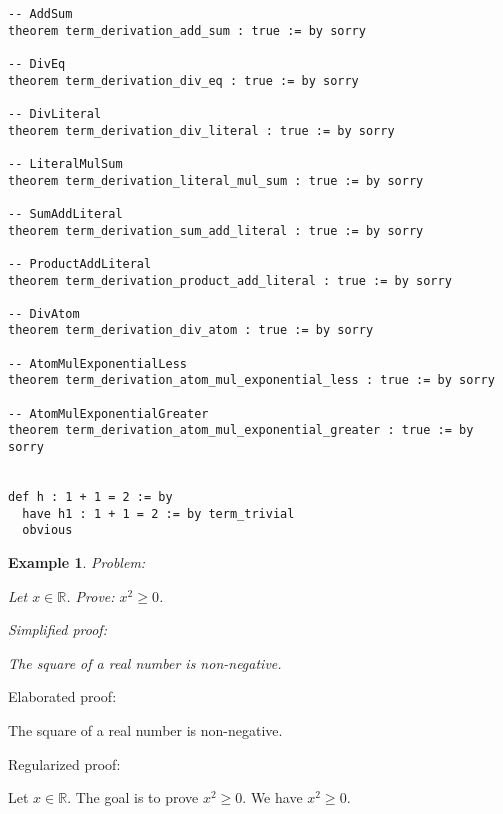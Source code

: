 \documentclass{article}
\newtheorem{example}{Example}
\begin{document}
\begin{tcolorbox}[colback=white!10, width=\linewidth]
\begin{lstlisting}[language=Lean4]
-- AddSum
theorem term_derivation_add_sum : true := by sorry

-- DivEq
theorem term_derivation_div_eq : true := by sorry

-- DivLiteral
theorem term_derivation_div_literal : true := by sorry

-- LiteralMulSum
theorem term_derivation_literal_mul_sum : true := by sorry

-- SumAddLiteral
theorem term_derivation_sum_add_literal : true := by sorry

-- ProductAddLiteral
theorem term_derivation_product_add_literal : true := by sorry

-- DivAtom
theorem term_derivation_div_atom : true := by sorry

-- AtomMulExponentialLess
theorem term_derivation_atom_mul_exponential_less : true := by sorry

-- AtomMulExponentialGreater
theorem term_derivation_atom_mul_exponential_greater : true := by sorry


def h : 1 + 1 = 2 := by
  have h1 : 1 + 1 = 2 := by term_trivial
  obvious

\end{lstlisting}
\end{tcolorbox}


\begin{example}
Problem:
\begin{tcolorbox}[colback=yellow!10, width=\linewidth]
Let $x\in\mathbb{R}$. Prove: $x^2\ge 0$.
\end{tcolorbox}

Simplified proof:
\begin{tcolorbox}[colback=blue!10, width=\linewidth]
The square of a real number is non-negative.
\end{tcolorbox}
\end{example}

Elaborated proof:
\begin{tcolorbox}[colback=green!10, width=\linewidth]
The square of a real number is non-negative.
\end{tcolorbox}

Regularized proof:
\begin{tcolorbox}[colback=red!10, width=\linewidth]
Let $x\in\mathbb{R}$.
The goal is to prove ${{x}}^2 \ge 0$.
We have ${{x}}^2 \ge 0$.
\end{tcolorbox}
\end{document}
